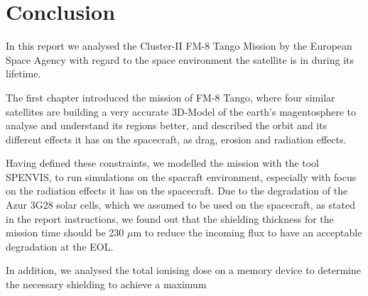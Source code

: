 \section{Conclusion}
In this report we analysed the Cluster-II FM-8 Tango Mission by the European Space Agency with regard to the space environment the satellite is in during its lifetime.

The first chapter introduced the mission of FM-8 Tango, where four similar satellites are building a very accurate 3D-Model of the earth's magentosphere to analyse and understand its regions better, and described the orbit and its different effects it has on the spacecraft, as drag, erosion and radiation effects.

Having defined these constraints, we modelled the mission with the tool SPENVIS, to run simulations on the spacraft environment, especially with focus on the radiation effects it has on the spacecraft.
Due to the degradation of the Azur 3G28 solar cells, which we assumed to be used on the spacecraft, as stated in the report instructions, we found out that the shielding thickness for the mission time should be 230 $\mu$m to reduce the incoming flux to have an acceptable degradation at the EOL.

In addition, we analysed the total ionising dose on a memory device to determine the necessary shielding to achieve a maximum